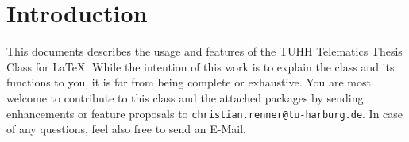 \chapter{Introduction}

This documents describes the usage and features of the TUHH Telematics Thesis Class for \LaTeX. While the intention of this work is to explain the class and its functions to you, it is far from being complete or exhaustive. You are most welcome to contribute to this class and the attached packages by sending enhancements or feature proposals to \texttt{christian.renner@tu-harburg.de}. In case of any questions, feel also free to send an E-Mail.


